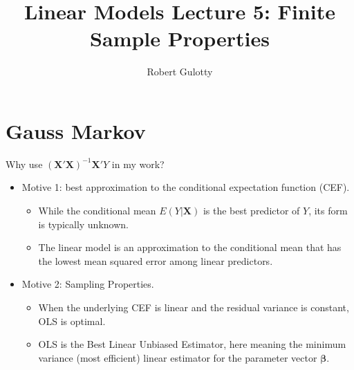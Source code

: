 \documentclass[aspectratio=169, handout]{beamer}
\title[PLSC 30700]{Linear Models Lecture 5: Finite Sample Properties}
\author{Robert Gulotty}
\institute[Chicago]{University of Chicago}
\numberwithin{equation}{section}
\begin{document}
\begin{frame}
\maketitle
\end{frame}
\section{Gauss Markov}

\begin{frame}{Why use $(\bm{X}'\bm{X})^{-1}\bm{X}'Y$ in my work?}
\begin{itemize}
\item Motive 1: best approximation to the conditional expectation function (CEF).
\begin{itemize}
\item While the conditional mean $E(Y|\bm{X})$ is the best predictor of $Y$, its form is typically unknown.
\item The linear model is an approximation to the conditional mean that has the lowest mean squared error among linear predictors.
\end{itemize}\pause
\item Motive 2: Sampling Properties.  
\begin{itemize}
\item When the underlying CEF is linear and the residual variance is constant, OLS is optimal.
\item OLS is the Best Linear Unbiased Estimator, here meaning the minimum variance (most efficient) linear estimator for the parameter vector $\bm{\beta}$.
\end{itemize}
\end{itemize}
\end{frame}
\end{document}
